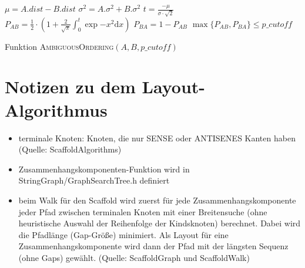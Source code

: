 \documentclass[a4paper,10pt,parskip]{scrartcl}
\begin{document}
\begin{algorithm}[H]
  $\mu = A.dist - B.dist$\;
  $\sigma^2 = A.\sigma^2 + B.\sigma^2$\;
  $t = \frac{-\mu}{\sigma\cdot\sqrt{2}}$\;
  $P_{AB} = \frac{1}{2} \cdot \left( 1 + \frac{2}{\sqrt{\pi}} \int_{0}^{t} \exp{-x^2}\mathrm dx\right)$\;
  $P_{BA} = 1 - P_{AB}$\;
  \Return $\max\{P_{AB}, P_{BA}\} \leq p\_cutoff$
  \caption{Funktion \textsc{AmbiguousOrdering}$(A, B, p\_cutoff)$}
\end{algorithm}

\section{Notizen zu dem Layout-Algorithmus}

\begin{itemize}
\item terminale Knoten: Knoten, die nur SENSE oder ANTISENES Kanten
  haben (Quelle: ScaffoldAlgorithms)
\item Zusammenhangskomponenten-Funktion wird in
  StringGraph/GraphSearchTree.h definiert
\item beim Walk für den Scaffold wird zuerst für jede
  Zusammenhangskomponente jeder Pfad zwischen terminalen Knoten mit
  einer Breitensuche (ohne heuristische Auswahl der Reihenfolge der
  Kindsknoten) berechnet. Dabei wird die Pfadlänge (Gap-Größe)
  minimiert. Als Layout für eine Zusammenhangskomponente wird dann
  der Pfad mit der längsten Sequenz (ohne Gaps) gewählt. (Quelle:
  ScaffoldGraph und ScaffoldWalk)
\end{itemize}
\end{document}
